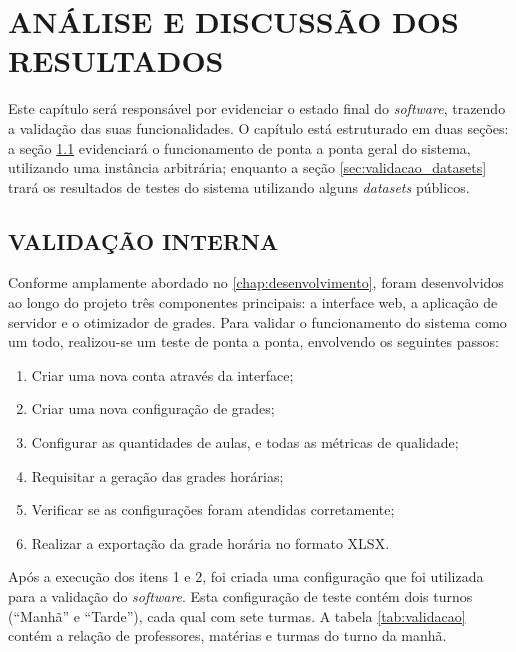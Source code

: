 
\chapter{ANÁLISE E DISCUSSÃO DOS RESULTADOS}
\label{chap:resultados}

Este capítulo será responsável por evidenciar o estado final do \textit{software}, trazendo a validação das suas funcionalidades. O capítulo está estruturado em duas seções: a seção \ref{sec:validacao_geral} evidenciará o funcionamento de ponta a ponta geral do sistema, utilizando uma instância arbitrária; enquanto a seção \ref{sec:validacao_datasets} trará os resultados de testes do sistema utilizando alguns \textit{datasets} públicos.

\section{VALIDAÇÃO INTERNA}
\label{sec:validacao_geral}

Conforme amplamente abordado no \autoref{chap:desenvolvimento}, foram desenvolvidos ao longo do projeto três componentes principais: a interface web, a aplicação de servidor e o otimizador de grades. Para validar o funcionamento do sistema como um todo, realizou-se um teste de ponta a ponta, envolvendo os seguintes passos:

\begin{enumerate}
	\item Criar uma nova conta através da interface;
	\item Criar uma nova configuração de grades;
	\item Configurar as quantidades de aulas, e todas as métricas de qualidade;
	\item Requisitar a geração das grades horárias;
	\item Verificar se as configurações foram atendidas corretamente;
	\item Realizar a exportação da grade horária no formato XLSX.
\end{enumerate}

Após a execução dos itens 1 e 2, foi criada uma configuração que foi utilizada para a validação do \textit{software}. Esta configuração de teste contém dois turnos (``Manhã'' e ``Tarde''), cada qual com sete turmas. A tabela \ref{tab:validacao} contém a relação de professores, matérias e turmas do turno da manhã. 


